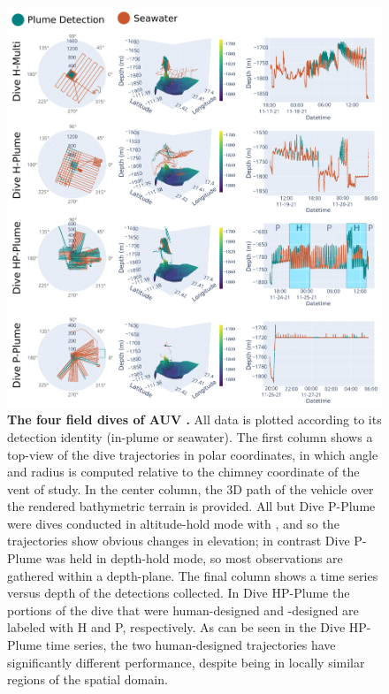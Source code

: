 \begin{figure}[h!]
    \centering
    \includegraphics[width=1.0\columnwidth]{figures/detections_data.png}
    \caption{\textbf{The four field dives of AUV \Sentry.} All data is plotted according to its detection identity (in-plume or seawater). The first column shows a top-view of the dive trajectories in polar coordinates, in which angle and radius is computed relative to the chimney coordinate of the vent of study. In the center column, the 3D path of the vehicle over the rendered bathymetric terrain is provided. All but Dive P-Plume were dives conducted in altitude-hold mode with \Sentry, and so the trajectories show obvious changes in elevation; in contrast Dive P-Plume was held in depth-hold mode, so most observations are gathered within a depth-plane. The final column shows a time series versus depth of the detections collected. In Dive HP-Plume the portions of the dive that were human-designed and \PHORTEX-designed are labeled with H and P, respectively. As can be seen in the Dive HP-Plume time series, the two human-designed trajectories have significantly different performance, despite being in locally similar regions of the spatial domain. }
    \label{fig:field_results}
\end{figure}


